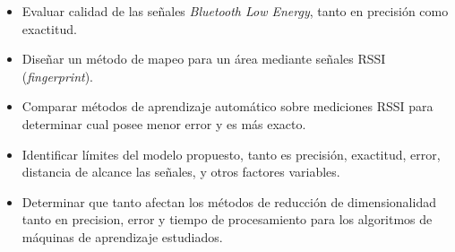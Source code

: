 \begin{itemize}
\item Evaluar calidad de las señales \textit{Bluetooth Low Energy}, tanto en precisión como exactitud.

\item Diseñar un método de mapeo para un área mediante señales RSSI (\textit{fingerprint}).

\item Comparar métodos de aprendizaje automático sobre mediciones RSSI para determinar cual posee menor error y es más exacto.

\item Identificar límites del modelo propuesto, tanto es precisión, exactitud, error, distancia de alcance las señales, y otros factores variables.

\item Determinar que tanto afectan los métodos de reducción de dimensionalidad tanto en precision, error y tiempo de procesamiento para los algoritmos de máquinas de aprendizaje estudiados.

\end{itemize}